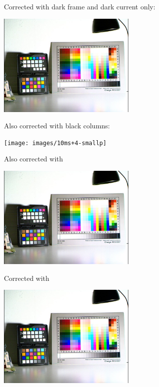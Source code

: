 {Corrected with dark frame and dark current only:\\
 
\begin{center}
\includegraphics[height=5cm]{images/10ms+4-no-blackcol-small}
\end{center}

Also corrected with black columns: 

\begin{center}
\texttt{[image: images/10ms+4-smallp]}
\end{center}

Also corrected with  

\begin{center}
\includegraphics[height=5cm]{images/10ms+4-fixrn-small}
\end{center}

Corrected with 

\begin{center}
\includegraphics[height=5cm]{images/10ms+4-rnfilter2-small}
\end{center}

}
